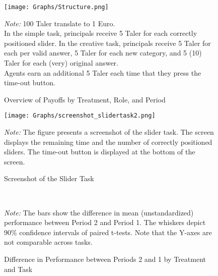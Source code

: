 
\begin{figure}[H]
\caption{Overview of Payoffs by Treatment, Role, and Period}
\begin{center}
\texttt{[image: Graphs/Structure.png]}
\label{fig:structure}
	\begin{minipage}{0.75\textwidth}
	\footnotesize
	\vspace{3mm}
	{\it Note:} 100 Taler translate to 1 Euro.\\
	In the simple task, principals receive 5 Taler for each correctly positioned slider. In the creative task, principals receive 5 Taler for each per valid answer, 5 Taler for each new category, and  5 (10) Taler for each (very) original answer.\\
	Agents earn an additional 5 Taler each time that they press the time-out button. 
	\end{minipage}
\end{center}
\end{figure}


\newpage

\begin{figure}[H]
\caption{Screenshot of the Slider Task}
\begin{center}
\texttt{[image: Graphs/screenshot\_slidertask2.png]}
\label{fig:screenshot}
	\begin{minipage}{0.75\textwidth}
	\footnotesize
	\vspace{3mm}
	{\it Note:} The figure presents a screenshot of the slider task. The screen displays the remaining time and the number of correctly positioned sliders. The time-out button is displayed at the bottom of the screen.  
	\end{minipage}
\end{center}
\end{figure}

\pagebreak

\begin{figure}[H]
	\centering
	\caption{Difference in Performance between Periods 2 and 1 by Treatment and Task}
	\label{fig:Bar_Chart_Round_1_2}
	\qquad
	\\
	\begin{minipage}{0.9\textwidth}
	\footnotesize
	{\it Note:} The bars show the difference in mean (unstandardized) performance between Period 2 and Period 1. The whiskers depict 90\% confidence intervals of paired t-tests. Note that the Y-axes are not comparable across tasks.
	\end{minipage}
\end{figure}





